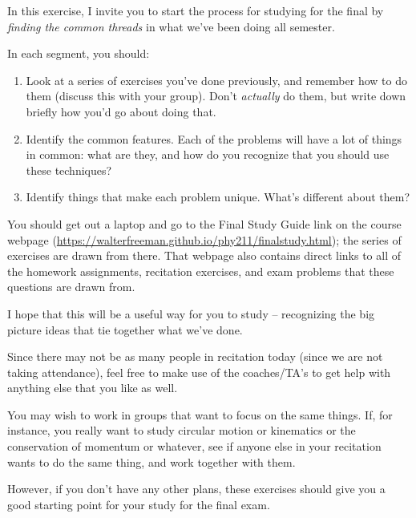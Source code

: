 \documentclass[12pt]{article}
\begin{document}
\Large
\centerline{}
\normalsize
\centerline{}

In this exercise, I invite you to start the process for studying for the final by {\it finding the common threads} in what we've been doing all semester. 

In each segment, you should:

\begin{enumerate}
	\item Look at a series of exercises you've done previously, and remember how to do them (discuss this with your group). Don't {\it actually} do them, but write down briefly how you'd go about doing that.
	\item Identify the common features. Each of the problems will have a lot of things in common: what are they, and how do you recognize that you should use these techniques?
	\item Identify things that make each problem unique. What's different about them?
\end{enumerate}

You should get out a laptop and go to the Final Study Guide link on the course webpage (\url{https://walterfreeman.github.io/phy211/finalstudy.html}); the series of exercises are drawn from there. That webpage also contains direct links to all of the homework assignments, recitation exercises, and exam problems that these questions are drawn from.

\vspace{1in}

I hope that this will be a useful way for you to study -- recognizing the big picture ideas that tie together what we've done.

\vspace{1in}

Since there may not be as many people in recitation today (since we are not taking attendance), feel free to make use of the coaches/TA's to get help with anything else that you like as well. 

You may wish to work in groups that want to focus on the same things. If, for instance, you really want to study circular motion or kinematics or the conservation of momentum or whatever, see if anyone else in your recitation wants to do the same thing, and work together with them.

\vspace{1in}

However, if you don't have any other plans, these exercises should give you a good starting point for your study for the final exam.
\end{document}
